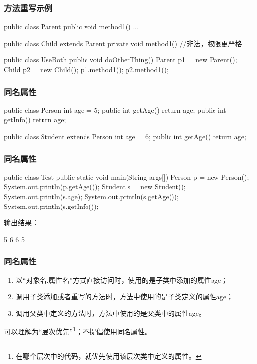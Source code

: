 \begin{frame}[fragile] %
\frametitle{方法重写示例}
\begin{javaCode}
public class Parent {
  public void method1() {...}
}
\end{javaCode}

\begin{javaCode}
public class Child extends Parent {
  private void method1() {} //非法，权限更严格
}
\end{javaCode}

\begin{javaCode}
public class UseBoth {
  public void doOtherThing() {
    Parent p1 = new Parent();
    Child p2 = new Child();
    p1.method1();
    p2.method1();
  }
}
\end{javaCode}
\end{frame}

\begin{frame}[fragile] %
\frametitle{同名属性}
\begin{javaCode}
  public class Person {
    int age = 5;
    public int getAge() {
      return age;
    }
    public int getInfo() {
      return age;
    }
  }
  \end{javaCode}

  \begin{javaCode}
  public class Student extends Person {
    int age = 6;
    public int getAge() {
      return age;
    }
  }
\end{javaCode}
\end{frame}

\begin{frame}[fragile] %
\frametitle{同名属性}
\begin{javaCode}
  public class Test {
    public static void main(String args[]) {
      Person p = new Person();
      System.out.println(p.getAge());
      Student s = new Student();
      System.out.println(s.age);
      System.out.println(s.getAge());
      System.out.println(s.getInfo());
    }
  }
\end{javaCode}

输出结果：
\begin{stdoutCode}
5
6
6
5
\end{stdoutCode}
\end{frame}

\begin{frame}
\frametitle{同名属性}
\begin{enumerate}
\item 以“对象名.属性名”方式直接访问时，使用的是子类中添加的属性age；
\item 调用子类添加或者重写的方法时，方法中使用的是子类定义的属性age；
\item 调用父类中定义的方法时，方法中使用的是父类中的属性age。
\end{enumerate}
{\hei 可以理解为“层次优先”\footnote{在哪个层次中的代码，就优先使用该层次类中定义的属性。}；\Red 不提倡使用同名属性。}
\end{frame}

